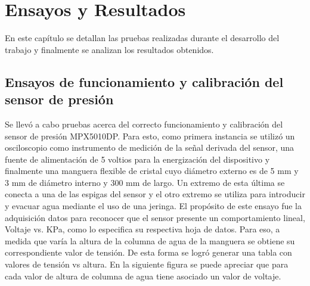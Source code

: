 
\chapter{Ensayos y Resultados} %

\label{Chapter4} %

En este capítulo se detallan las pruebas realizadas durante el desarrollo del trabajo y finalmente se analizan los resultados obtenidos.
\section{Ensayos de funcionamiento y calibración del sensor de presión
}
\label{sec:Ensayos de funcionamiento y calibración del sensor de presión
}
Se llevó a cabo pruebas acerca del correcto funcionamiento y calibración del sensor de presión MPX5010DP. Para esto, como primera instancia se utilizó un osciloscopio como instrumento de medición de la señal derivada del sensor, una fuente de alimentación de 5 voltios para la energización del dispositivo y finalmente una manguera flexible de cristal cuyo diámetro externo es de 5 mm y 3 mm de diámetro interno y 300 mm de largo. Un extremo de esta última se conecta a una de las espigas del sensor y el otro extremo se utiliza para introducir y evacuar agua mediante el uso de una jeringa. El propósito de este ensayo fue la adquisición datos para reconocer que el sensor presente un comportamiento lineal, Voltaje vs. KPa, como lo especifica su respectiva hoja de datos. Para eso, a medida que varía la altura de la columna de agua de la manguera se obtiene su correspondiente valor de tensión. De esta forma se logró generar una tabla con valores de tensión vs altura.       
En la siguiente figura se puede apreciar que para cada valor de altura de columna de agua tiene asociado un valor de voltaje.  


